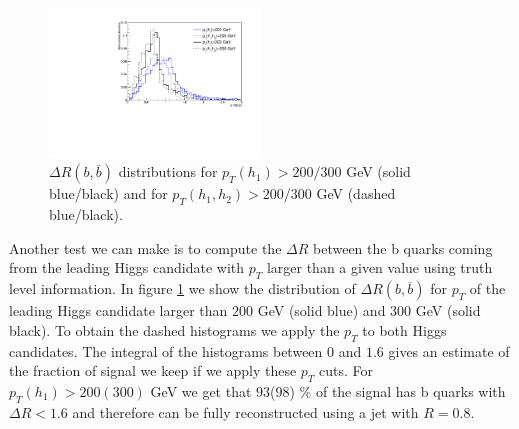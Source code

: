 \begin{figure}
	\centering
	\includegraphics[width=0.5\textwidth]{./Figures/deltaR.pdf}
	\caption{\label{fig:deltaRbb} $\Delta R(b,\overline{b})$ distributions for $p_T(h_1)>200/300$ GeV (solid blue/black) and for $p_T(h_1,h_2)>200/300$ GeV (dashed blue/black).}
\end{figure}

Another test we can make is to compute the $\Delta R$ between the b quarks coming from the leading Higgs candidate with $p_T$ larger than a given value using truth level information. In figure \ref{fig:deltaRbb} we show the distribution of $\Delta R(b,\overline{b})$ for $p_T$ of the leading Higgs candidate larger than $200$ GeV (solid blue) and $300$ GeV (solid black). To obtain the dashed histograms we apply the $p_T$ to both Higgs candidates. The integral of the histograms between $0$ and $1.6$ gives an estimate of the fraction of signal we keep if we apply these $p_T$ cuts. For $p_T(h_1)>200(300)$ GeV we get that $93$($98$) \% of the signal has b quarks with $\Delta R <1.6$ and therefore can be fully reconstructed using a jet with $R=0.8$.



